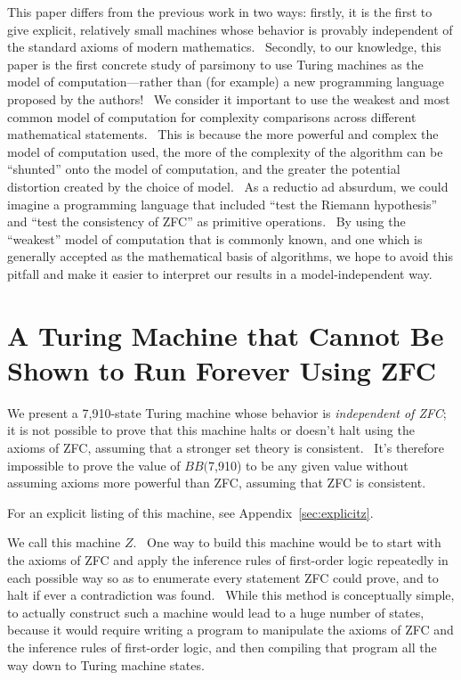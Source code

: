 \documentclass[11pt]{article}
\newcommand{\statenumstate}{7,910-state }
\newcommand{\bbstatenum}{$BB($7,910) }
\begin{document}
This paper differs from the previous work in two ways: firstly, it is the first to give explicit, relatively small machines whose behavior is provably independent of the standard axioms of modern mathematics. \ Secondly, to our knowledge, this paper is the first concrete study of parsimony to use Turing machines as the model of computation---rather than (for example) a new programming language proposed by the authors! \ We consider it important to use the weakest and most common model of computation for complexity comparisons across different mathematical statements. \ This is because the more powerful and complex the model of computation used, the more of the complexity of the algorithm can be ``shunted'' onto the model of computation, and the greater the potential distortion created by the choice of model. \ As a reductio ad absurdum, we could imagine a programming language that included ``test the Riemann hypothesis'' and ``test the consistency of ZFC'' as primitive operations. \ By using the ``weakest'' model of computation that is commonly known, and one which is generally accepted as the mathematical basis of algorithms, we hope to avoid this pitfall and make it easier to interpret our results in a model-independent way.

\section{A Turing Machine that Cannot Be Shown to Run Forever Using ZFC}

We present a \statenumstate Turing machine whose behavior is \emph{independent of ZFC}; it is not possible to prove that this machine halts or doesn't halt using the axioms of ZFC, assuming that a stronger set theory is consistent. \ It's therefore impossible to prove the value of \bbstatenum to be any given value without assuming axioms more powerful than ZFC, assuming that ZFC is consistent.

For an explicit listing of this machine, see Appendix~\ref{sec:explicitz}.

We call this machine $Z$. \ One way to build this machine would be to start with the axioms of ZFC and apply the inference rules of first-order logic repeatedly in each possible way so as to enumerate every statement ZFC could prove, and to halt if ever a contradiction was found. \ While this method is conceptually simple, to actually construct such a machine would lead to a huge number of states, because it would require writing a program to manipulate the axioms of ZFC and the inference rules of first-order logic, and then compiling that program all the way down to Turing machine states.
\end{document}

